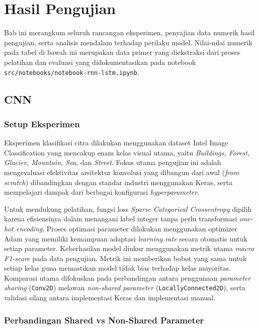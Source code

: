 
\chapter{Hasil Pengujian}

Bab ini merangkum seluruh rancangan eksperimen, penyajian data numerik hasil pengujian, serta analisis mendalam terhadap perilaku model. Nilai-nilai numerik pada tabel di bawah ini merupakan data primer yang diekstraksi dari proses pelatihan dan evaluasi yang didokumentasikan pada notebook \texttt{src/notebooks/notebook-rnn-lstm.ipynb}.

\section{CNN}

\subsection{Setup Eksperimen}

Eksperimen klasifikasi citra dilakukan menggunakan dataset Intel Image Classification yang mencakup enam kelas visual utama, yaitu \textit{Buildings, Forest, Glacier, Mountain, Sea,} dan \textit{Street}. Fokus utama pengujian ini adalah mengevaluasi efektivitas arsitektur konvolusi yang dibangun dari awal (\textit{from scratch}) dibandingkan dengan standar industri menggunakan Keras, serta mempelajari dampak dari berbagai konfigurasi \textit{hyperparameter}.

Untuk mendukung pelatihan, fungsi loss \textit{Sparse Categorical Crossentropy} dipilih karena efisiensinya dalam menangani label integer tanpa perlu transformasi \textit{one-hot encoding}. Proses optimasi parameter dilakukan menggunakan optimizer Adam yang memiliki kemampuan adaptasi \textit{learning rate} secara otomatis untuk setiap parameter. Keberhasilan model diukur menggunakan metrik utama \textit{macro F1-score} pada data pengujian. Metrik ini memberikan bobot yang sama untuk setiap kelas guna memastikan model tidak bias terhadap kelas mayoritas. Komparasi utama difokuskan pada perbandingan antara penggunaan \textit{parameter sharing} (\texttt{Conv2D}) melawan \textit{non-shared parameter} (\texttt{LocallyConnected2D}), serta validasi silang antara implementasi Keras dan implementasi manual.

\subsection{Perbandingan Shared vs Non-Shared Parameter}

